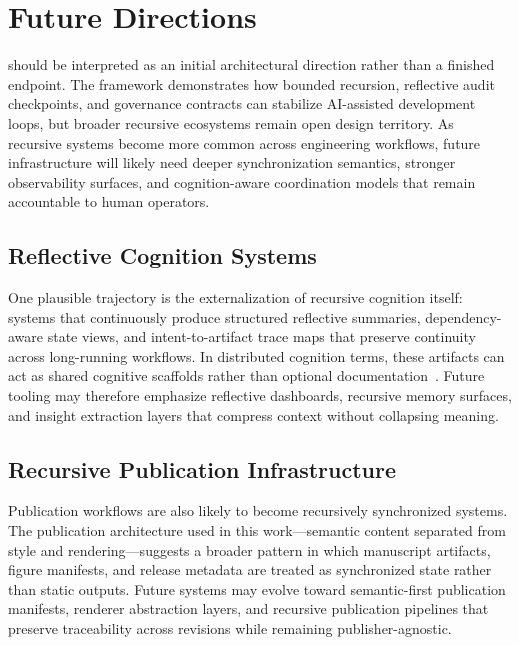 \section{Future Directions}
\label{sec:future-directions}

 should be interpreted as an initial architectural direction rather than a finished endpoint. The framework demonstrates how bounded recursion, reflective audit checkpoints, and governance contracts can stabilize AI-assisted development loops, but broader recursive ecosystems remain open design territory. As recursive systems become more common across engineering workflows, future infrastructure will likely need deeper synchronization semantics, stronger observability surfaces, and cognition-aware coordination models that remain accountable to human operators.

\subsection{Reflective Cognition Systems}

One plausible trajectory is the externalization of recursive cognition itself: systems that continuously produce structured reflective summaries, dependency-aware state views, and intent-to-artifact trace maps that preserve continuity across long-running workflows. In distributed cognition terms, these artifacts can act as shared cognitive scaffolds rather than optional documentation~\cite{Hutchins1995CognitionWild}. Future tooling may therefore emphasize reflective dashboards, recursive memory surfaces, and insight extraction layers that compress context without collapsing meaning.

\subsection{Recursive Publication Infrastructure}

Publication workflows are also likely to become recursively synchronized systems. The publication architecture used in this work---semantic content separated from style and rendering---suggests a broader pattern in which manuscript artifacts, figure manifests, and release metadata are treated as synchronized state rather than static outputs. Future systems may evolve toward semantic-first publication manifests, renderer abstraction layers, and recursive publication pipelines that preserve traceability across revisions while remaining publisher-agnostic.


